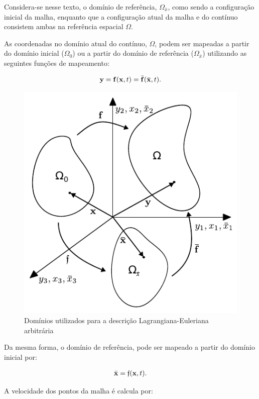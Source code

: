 \documentclass[tese_patricia]{subfiles}%
\begin{document}
Considera-se nesse texto, o domínio de referência, $\Omega_{\bar{x}}$, como sendo a configuração inicial da malha, enquanto que a configuração atual da malha e do contínuo consistem ambas na referência espacial $\Omega$.

As coordenadas no domínio atual do contínuo, $\Omega$, podem ser mapeadas a partir do domínio inicial ($\Omega_0$) ou a partir do domínio de referência ($\Omega_{\bar{x}}$) utilizando as seguintes funções de mapeamento:  

\begin{align}
	\mathbf{y} = \mathbf{f}(\mathbf{x},t) = \bar{\mathbf{f}}(\bar{\mathbf{x}},t).
	\label{eq:Pos}
\end{align}

\begin{figure}[htb!]
	\centering
	\includegraphics[scale=1.0]{Imagens/Cap2/ALE.pdf}	
	\caption{Domínios utilizados para a descrição Lagrangiana-Euleriana arbitrária}
	\label{fig:Ale}
\end{figure}

Da mesma forma, o domínio de referência, pode ser mapeado a partir do domínio inicial por:

\begin{align}
	\bar{\mathbf{x}} = \mathfrak{f}(\mathbf{x},t).
	\label{eq:PosALE}
\end{align}

A velocidade dos pontos da malha é calcula por:
\end{document}
